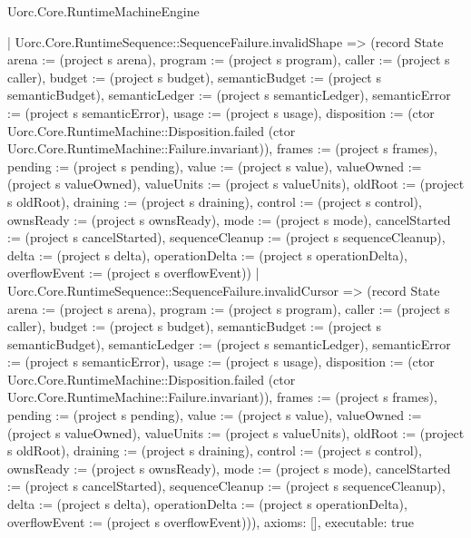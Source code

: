\begin{lexlean}{Uorc.Core.RuntimeMachineEngine}
\begin{semanticmodule}
{    | Uorc.Core.RuntimeSequence::SequenceFailure.invalidShape => (record State {arena := (project s arena), program := (project s program), caller := (project s caller), budget := (project s budget), semanticBudget := (project s semanticBudget), semanticLedger := (project s semanticLedger), semanticError := (project s semanticError), usage := (project s usage), disposition := (ctor Uorc.Core.RuntimeMachine::Disposition.failed (ctor Uorc.Core.RuntimeMachine::Failure.invariant)), frames := (project s frames), pending := (project s pending), value := (project s value), valueOwned := (project s valueOwned), valueUnits := (project s valueUnits), oldRoot := (project s oldRoot), draining := (project s draining), control := (project s control), ownsReady := (project s ownsReady), mode := (project s mode), cancelStarted := (project s cancelStarted), sequenceCleanup := (project s sequenceCleanup), delta := (project s delta), operationDelta := (project s operationDelta), overflowEvent := (project s overflowEvent)})
    | Uorc.Core.RuntimeSequence::SequenceFailure.invalidCursor => (record State {arena := (project s arena), program := (project s program), caller := (project s caller), budget := (project s budget), semanticBudget := (project s semanticBudget), semanticLedger := (project s semanticLedger), semanticError := (project s semanticError), usage := (project s usage), disposition := (ctor Uorc.Core.RuntimeMachine::Disposition.failed (ctor Uorc.Core.RuntimeMachine::Failure.invariant)), frames := (project s frames), pending := (project s pending), value := (project s value), valueOwned := (project s valueOwned), valueUnits := (project s valueUnits), oldRoot := (project s oldRoot), draining := (project s draining), control := (project s control), ownsReady := (project s ownsReady), mode := (project s mode), cancelStarted := (project s cancelStarted), sequenceCleanup := (project s sequenceCleanup), delta := (project s delta), operationDelta := (project s operationDelta), overflowEvent := (project s overflowEvent)})),
  axioms: [],
  executable: true
}


\end{semanticmodule}
\end{lexlean}
